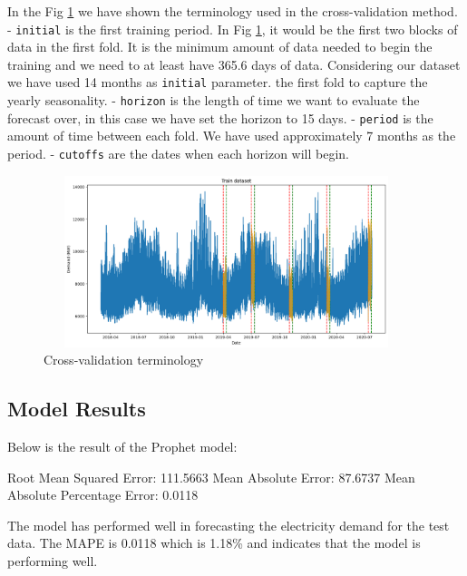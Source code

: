 \documentclass[mstat,12pt]{unswthesis}
\newenvironment{Shaded}{\begin{snugshade}}{\end{snugshade}}
\newcommand{\FloatTok}[1]{\textcolor[rgb]{0.00,0.00,0.81}{#1}}
\newcommand{\NormalTok}[1]{#1}
\begin{document}
In the Fig \ref{cross_validation_output} we have shown the terminology
used in the cross-validation method. - \texttt{initial} is the first
training period. In Fig \ref{cross_validation_output}, it would be the
first two blocks of data in the first fold. It is the minimum amount of
data needed to begin the training and we need to at least have 365.6
days of data. Considering our dataset we have used 14 months as
\texttt{initial} parameter. the first fold to capture the yearly
seasonality. - \texttt{horizon} is the length of time we want to
evaluate the forecast over, in this case we have set the horizon to 15
days. - \texttt{period} is the amount of time between each fold. We have
used approximately 7 months as the period. - \texttt{cutoffs} are the
dates when each horizon will begin.

\begin{figure}[H]
\centering
\includegraphics[width=0.95\textwidth, height=5cm]{cross_validation_output.png}
\caption{Cross-validation terminology}\label{cross_validation_output}
\end{figure}

\subsection{Model Results}\label{model-results-1}

Below is the result of the Prophet model:

\begin{Shaded}
\begin{Highlighting}[]
\NormalTok{Root Mean Squared Error: }\FloatTok{111.5663}
\NormalTok{Mean Absolute Error: }\FloatTok{87.6737}
\NormalTok{Mean Absolute Percentage Error: }\FloatTok{0.0118}
\end{Highlighting}
\end{Shaded}

The model has performed well in forecasting the electricity demand for
the test data. The MAPE is 0.0118 which is 1.18\% and indicates that the
model is performing well.
\end{document}

